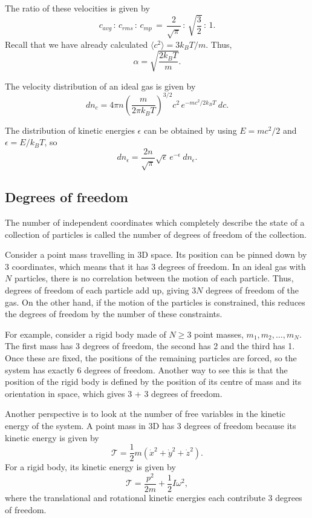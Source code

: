 \documentclass[11pt]{article}
\newcommand\E[1]{\langle #1 \rangle}
\theoremstyle{definition}
\theoremstyle{remark}
\numberwithin{equation}{section}
\begin{document}
    The ratio of these velocities is given by \[
        c_{avg} \,:\, c_{rms} \,:\, c_{mp} \,=\, 
            \frac{2}{\sqrt{\pi}} \,:\, \sqrt{\frac{3}{2}} \,:\, 1.
    \] Recall that we have already calculated $\E{c^2} = 3 k_B T /m$. Thus, \[
        \alpha = \sqrt{\frac{2k_B T}{m}}.
    \]
    \begin{theorem}
        The velocity distribution of an ideal gas is given by \[
            dn_c = 4\pi n\left( \frac{m}{2\pi k_B T} \right)^{3 /2} c^2\, e^{-mc^2 /
            2k_B T} \:dc.
        \] 
    \end{theorem}
    The distribution of kinetic energies $\epsilon$ can be obtained by using $E =
    mc^2 / 2$ and $\epsilon = E / k_B T$, so \[
        dn_\epsilon = \frac{2n}{\sqrt{\pi}}\sqrt{\epsilon}\,
        e^{-\epsilon}\:dn_\epsilon.
    \] 

    \subsection{Degrees of freedom}
    \begin{definition}
        The number of independent coordinates which completely describe the state of
        a collection of particles is called the number of degrees of freedom of the
        collection.
    \end{definition}

    Consider a point mass travelling in 3D space. Its position can be pinned down by
    3 coordinates, which means that it has 3 degrees of freedom. In an ideal gas
    with $N$ particles, there is no correlation between the motion of each particle.
    Thus, degrees of freedom of each particle add up, giving $3N$ degrees of freedom
    of the gas. On the other hand, if the motion of the particles is constrained,
    this reduces the degrees of freedom by the number of these constraints.

    For example, consider a rigid body made of $N \geq 3$ point masses, $m_1, m_2,
    \dots, m_N$. The first mass has 3 degrees of freedom, the second has 2 and the
    third has 1. Once these are fixed, the positions of the remaining particles are
    forced, so the system has exactly 6 degrees of freedom. Another way to see this
    is that the position of the rigid body is defined by the position of its centre
    of mass and its orientation in space, which gives 3 + 3 degrees of freedom.
    
    Another perspective is to look at the number of free variables in the kinetic
    energy of the system. A point mass in 3D has 3 degrees of freedom because its
    kinetic energy is given by \[
        \mathscr{T} = \frac{1}{2}m(\dot{x}^2 + \dot{y}^2 + \dot{z}^2).
    \] For a rigid body, its kinetic energy is given by \[
        \mathscr{T} = \frac{p^2}{2m} + \frac{1}{2}I\omega^2,
    \] where the translational and rotational kinetic energies each contribute 3
    degrees of freedom.
\end{document}
